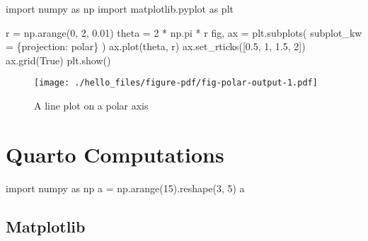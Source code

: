 \documentclass[
  letterpaper,
  DIV=11,
  numbers=noendperiod]{scrreprt}
\newenvironment{Shaded}{\begin{snugshade}}{\end{snugshade}}
\newcommand{\DecValTok}[1]{\textcolor[rgb]{0.68,0.00,0.00}{#1}}
\newcommand{\FloatTok}[1]{\textcolor[rgb]{0.68,0.00,0.00}{#1}}
\newcommand{\ImportTok}[1]{\textcolor[rgb]{0.00,0.46,0.62}{#1}}
\newcommand{\NormalTok}[1]{\textcolor[rgb]{0.00,0.23,0.31}{#1}}
\newcommand{\OperatorTok}[1]{\textcolor[rgb]{0.37,0.37,0.37}{#1}}
\newcommand{\StringTok}[1]{\textcolor[rgb]{0.13,0.47,0.30}{#1}}
\newcommand{\VariableTok}[1]{\textcolor[rgb]{0.07,0.07,0.07}{#1}}
\begin{document}
\begin{Shaded}
\begin{Highlighting}[]
\ImportTok{import}\NormalTok{ numpy }\ImportTok{as}\NormalTok{ np}
\ImportTok{import}\NormalTok{ matplotlib.pyplot }\ImportTok{as}\NormalTok{ plt}

\NormalTok{r }\OperatorTok{=}\NormalTok{ np.arange(}\DecValTok{0}\NormalTok{, }\DecValTok{2}\NormalTok{, }\FloatTok{0.01}\NormalTok{)}
\NormalTok{theta }\OperatorTok{=} \DecValTok{2} \OperatorTok{*}\NormalTok{ np.pi }\OperatorTok{*}\NormalTok{ r}
\NormalTok{fig, ax }\OperatorTok{=}\NormalTok{ plt.subplots(}
\NormalTok{  subplot\_kw }\OperatorTok{=}\NormalTok{ \{}\StringTok{\textquotesingle{}projection\textquotesingle{}}\NormalTok{: }\StringTok{\textquotesingle{}polar\textquotesingle{}}\NormalTok{\}}
\NormalTok{)}
\NormalTok{ax.plot(theta, r)}
\NormalTok{ax.set\_rticks([}\FloatTok{0.5}\NormalTok{, }\DecValTok{1}\NormalTok{, }\FloatTok{1.5}\NormalTok{, }\DecValTok{2}\NormalTok{])}
\NormalTok{ax.grid(}\VariableTok{True}\NormalTok{)}
\NormalTok{plt.show()}
\end{Highlighting}
\end{Shaded}

\begin{figure}[H]

{\centering \texttt{[image: ./hello\_files/figure-pdf/fig-polar-output-1.pdf]}

}

\caption{\label{fig-polar}A line plot on a polar axis}

\end{figure}


\hypertarget{quarto-computations}{%
\chapter{Quarto Computations}\label{quarto-computations}}

\begin{Shaded}
\begin{Highlighting}[]
\ImportTok{import}\NormalTok{ numpy }\ImportTok{as}\NormalTok{ np}
\NormalTok{a }\OperatorTok{=}\NormalTok{ np.arange(}\DecValTok{15}\NormalTok{).reshape(}\DecValTok{3}\NormalTok{, }\DecValTok{5}\NormalTok{)}
\NormalTok{a}
\end{Highlighting}
\end{Shaded}

\hypertarget{matplotlib}{%
\section{Matplotlib}\label{matplotlib}}
\end{document}
